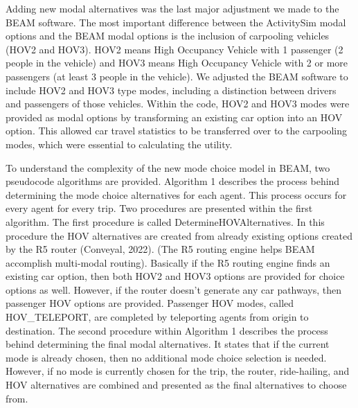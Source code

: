 \documentclass[fancy, masters]{byuthesis}
\begin{document}
Adding new modal alternatives was the last major adjustment we made to the BEAM software. The most important difference between the ActivitySim modal options and the BEAM modal options is the inclusion of carpooling vehicles (HOV2 and HOV3). HOV2 means High Occupancy Vehicle with 1 passenger (2 people in the vehicle) and HOV3 means High Occupancy Vehicle with 2 or more passengers (at least 3 people in the vehicle). We adjusted the BEAM software to include HOV2 and HOV3 type modes, including a distinction between drivers and passengers of those vehicles. Within the code, HOV2 and HOV3 modes were provided as modal options by transforming an existing car option into an HOV option. This allowed car travel statistics to be transferred over to the carpooling modes, which were essential to calculating the utility.

To understand the complexity of the new mode choice model in BEAM, two pseudocode algorithms are provided. Algorithm 1 describes the process behind determining the mode choice alternatives for each agent. This process occurs for every agent for every trip. Two procedures are presented within the first algorithm. The first procedure is called DetermineHOVAlternatives. In this procedure the HOV alternatives are created from already existing options created by the R5 router (Conveyal, 2022). (The R5 routing engine helps BEAM accomplish multi-modal routing). Basically if the R5 routing engine finds an existing car option, then both HOV2 and HOV3 options are provided for choice options as well. However, if the router doesn't generate any car pathways, then passenger HOV options are provided. Passenger HOV modes, called HOV\_TELEPORT, are completed by teleporting agents from origin to destination. The second procedure within Algorithm 1 describes the process behind determining the final modal alternatives. It states that if the current mode is already chosen, then no additional mode choice selection is needed. However, if no mode is currently chosen for the trip, the router, ride-hailing, and HOV alternatives are combined and presented as the final alternatives to choose from.
\end{document}
